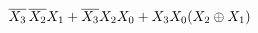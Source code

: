 \documentclass[preview]{standalone}
\begin{document}
\begin{align*}
\overline{X_3}\nobreak\hspace{.16667em plus .08333em}\overline{X_2}X_1+\overline{X_3}X_2X_0+X_3X_0(X_2\oplus X_1)
\end{align*}
\end{document}
